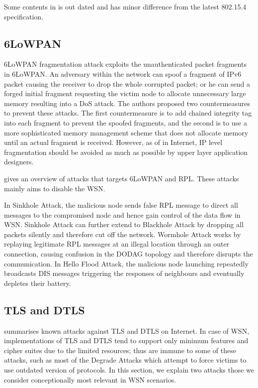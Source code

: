 Some contents in \cite{802154sec} is out dated and has minor difference from the latest 802.15.4 specification.

\subsection{6LoWPAN}
6LoWPAN fragmentation attack\cite{6lpFragAtk} exploits the unauthenticated packet fragments in 6LoWPAN. An adversary within the network can spoof a fragment of IPv6 packet causing the receiver to drop the whole corrupted  packet; or he can send a forged initial fragment requesting the victim node to allocate unnecessary large memory resulting into a DoS attack. The authors proposed two countermeasures to prevent these  attacks. The first countermeasure is to add chained integrity tag into each fragment to prevent the spoofed fragments, and the second is to use a more sophisticated memory management scheme that does not allocate memory until an actual fragment is received. However, as of in Internet, IP level fragmentation should be avoided as much as possible by upper layer application designers.

\cite{6lpRplAtk} gives an overview of attacks that targets 6LoWPAN and RPL. These attacks mainly aims to disable the WSN. 

In Sinkhole Attack\cite{Sinkhole}, the malicious node sends false RPL message to direct all messages to the compromised node and hence gain control of the data flow in WSN. Sinkhole Attack can further extend to Blackhole Attack\cite{Blackhole} by dropping all packets silently and therefore cut off the network. Wormhole Attack\cite{Wormhole} works by replaying legitimate RPL messages at an illegal location through an outer connection, causing confusion in the DODAG topology and therefore disrupts the communication. In Hello Flood Attack\cite{HelloFlood}, the malicious node launching repeatedly broadcasts DIS messages triggering the responses of neighbours and eventually depletes their battery.

\subsection{TLS and DTLS}

\cite{rfc7457} summarises known attacks  against TLS and DTLS on Internet. In case of WSN, implementations of TLS and DTLS tend to support only minimum features and cipher suites due to the limited resources; thus are immune to some of these attacks, such as most of the Degrade Attacks\cite{rfc7457} which attempt to force victims to use outdated version of protocols. In this section, we explain two attacks those we consider conceptionally most relevant in WSN scenarios.

